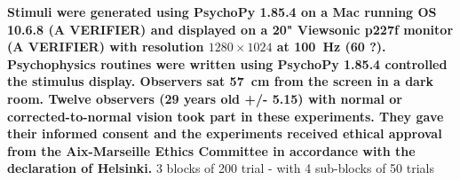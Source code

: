 \documentclass[12pt,english]{article}%
\begin{document}
\textbf{Stimuli were generated using PsychoPy 1.85.4 on a Mac running OS 10.6.8 (A VERIFIER) and displayed on a 20" Viewsonic p227f monitor (A VERIFIER) with resolution $1280\times 1024$ at 100~\si{\Hz} (60 ?). Psychophysics routines were written using PsychoPy 1.85.4 controlled the stimulus display. Observers sat 57~\si{\cm} from the screen in a dark room. Twelve observers (29 years old +/- 5.15) with normal or corrected-to-normal vision took part in these experiments. They gave their informed consent and the experiments received ethical approval from the Aix-Marseille Ethics Committee in accordance with the declaration of Helsinki.}
3 blocks of 200 trial - with 4 sub-blocks of 50 trials
\end{document}
